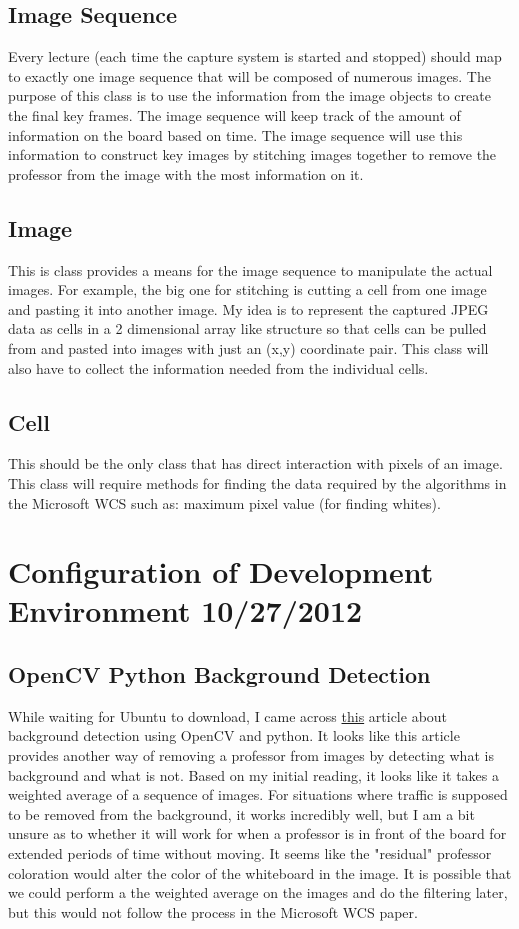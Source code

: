 \documentclass[]{article}
\begin{document}
		 \subsection{Image Sequence}
			Every lecture (each time the capture system is started and stopped) should map to exactly one image sequence that will be composed of numerous images. The purpose of this class is to use the information from the image objects to create the final key frames. The image sequence will keep track of the amount of information on the board based on time. The image sequence will use this information to construct key images by stitching images together to remove the professor from the image with the most information on it. 
			
		\subsection{Image}
			This is class provides a means for the image sequence to manipulate the actual images. For example, the big one for stitching is cutting a cell from one image and pasting it into another image. My idea is to represent the captured JPEG data as cells in a 2 dimensional array like structure so that cells can be pulled from and pasted into images with just an (x,y) coordinate pair. This class will also have to collect the information needed from the individual cells.
			
		\subsection{Cell}
			This should be the only class that has direct interaction with pixels of an image. This class will require methods for finding the data required by the algorithms in the Microsoft WCS such as: maximum pixel value (for finding whites).
	
	
	\section{Configuration of Development Environment 10/27/2012}
	
		\subsection{OpenCV Python Background Detection}
			While waiting for Ubuntu to download, I came across \href{http://opencvpython.blogspot.com/}{this} article about background detection using OpenCV and python. It looks like this article provides another way of removing a professor from images by detecting what is background and what is not. Based on my initial reading, it looks like it takes a weighted average of a sequence of images. For situations where traffic is supposed to be removed from the background, it works incredibly well, but I am a bit unsure as to whether it will work for when a professor is in front of the board for extended periods of time without moving. It seems like the "residual" professor coloration would alter the color of the whiteboard in the image. It is possible that we could perform a the weighted average on the images and do the filtering later, but this would not follow the process in the Microsoft WCS paper. 
	
\end{document}
